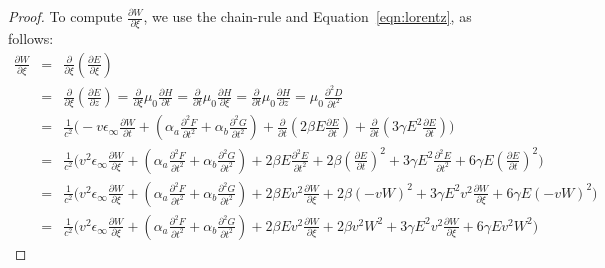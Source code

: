 \documentclass{article}[12pt]
\theoremstyle{plain}
\begin{document}
\begin{proof}
To compute $\frac{\partial W}{\partial \xi}$, we use the chain-rule and Equation~\ref{eqn:lorentz},
as follows:
\begin{eqnarray}
\frac{\partial W}{\partial \xi} & = & \frac{\partial}{\partial \xi} ( \frac{\partial E}{\partial \xi}) \\
& = & \frac{\partial}{\partial \xi} ( \frac{\partial E}{\partial z}) = \frac{\partial}{\partial \xi} \mu_0 \frac{\partial H}{\partial t} = \frac{\partial}{\partial t} \mu_0 \frac{\partial H}{\partial \xi} 
= \frac{\partial}{\partial t} \mu_0 \frac{\partial H}{\partial z} = \mu_0 \frac{\partial^2 D}{\partial t^2}\\
& = & \frac{1}{c^2} \Big( -v\epsilon_\infty \frac{\partial W}{\partial t} + (\alpha_a \frac{\partial^2 F}{\partial t^2}
+ \alpha_b \frac{\partial^2 G}{\partial t^2}) + \frac{\partial }{\partial t}(2\beta E\frac{\partial E}{\partial t})
+ \frac{\partial }{\partial t}(3\gamma E^2\frac{\partial E}{\partial t})\Big)\\
& = & \frac{1}{c^2} \Big( v^2\epsilon_\infty \frac{\partial W}{\partial \xi} + (\alpha_a \frac{\partial^2 F}{\partial t^2}
+ \alpha_b \frac{\partial^2 G}{\partial t^2}) + 2 \beta E \frac{\partial^2 E}{\partial t^2} + 
2\beta (\frac{\partial E}{\partial t})^2 + 3\gamma E^2 \frac{\partial^2 E}{\partial t^2} +
6\gamma E (\frac{\partial E}{\partial t})^2\Big) \nonumber \\
& = & \frac{1}{c^2} \Big( v^2\epsilon_\infty \frac{\partial W}{\partial \xi} + (\alpha_a \frac{\partial^2 F}{\partial t^2}
+ \alpha_b \frac{\partial^2 G}{\partial t^2}) + 2 \beta E v^2 \frac{\partial W}{\partial \xi}
+ 2\beta (-vW)^2 + 3\gamma E^2 v^2 \frac{\partial W}{\partial \xi} + 6\gamma E (-vW)^2 \nonumber \Big) \\
& = & \frac{1}{c^2} \Big( v^2\epsilon_\infty \frac{\partial W}{\partial \xi} + (\alpha_a \frac{\partial^2 F}{\partial t^2}
+ \alpha_b \frac{\partial^2 G}{\partial t^2}) + 2 \beta E v^2 \frac{\partial W}{\partial \xi}
+ 2 \beta v^2 W^2 + 3\gamma E^2 v^2 \frac{\partial W}{\partial \xi} + 6\gamma E v^2W^2 \nonumber \Big) 
\end{eqnarray}


\end{proof}
\end{document}
